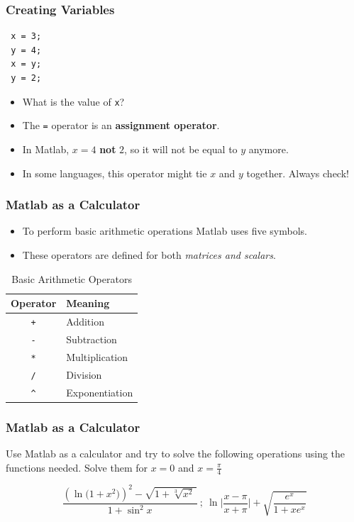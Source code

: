 \documentclass[11pt,xcolor={svgnames},aspectratio=169,usepdftitle=false]{beamer}
\begin{document}
\begin{frame}[fragile]
  \frametitle{Creating Variables}
 \begin{lstlisting}
 x = 3;
 y = 4;
 x = y;
 y = 2;
 \end{lstlisting}
 \begin{itemize}
  \item What is the value of \verb;x;?
  \pause
  \item The \verb;=; operator is an \alert{\textbf{assignment operator}}. 
  \item In Matlab, $x = 4$ \alert{\textbf{not}} $2$, so it will not be equal to $y$ anymore. 
  \item In some languages, this operator might tie $x$ and $y$ together. Always check!
 \end{itemize}
  
\end{frame}

\begin{frame}[fragile]
    \frametitle{Matlab as a Calculator}
    \begin{itemize}
        \item To perform basic arithmetic operations Matlab uses five symbols.
        \item These operators are defined for both \alert{\textit{matrices and scalars}}.
    \end{itemize}
\begin{table}[htbp]
    \caption{Basic Arithmetic Operators}
    \label{tab:basic_operators}
    \begin{tabular}{@{}cl@{}}
    \toprule
    Operator & Meaning \\ \midrule
    \verb;+;  & Addition \\ 
    \verb;-;  & Subtraction \\ 
    \verb;*;  & Multiplication \\ 
    \verb;/;  & Division \\ 
    \verb;^;  & Exponentiation \\ \bottomrule
    \end{tabular}
\end{table}
\end{frame}

\begin{frame}
    \frametitle{Matlab as a Calculator}
\begin{exercise} 
    Use Matlab as a calculator and try to solve the following operations using the functions needed. Solve them for $x = 0$ and $x = \frac{\pi}{4}$
    
    \[
            \frac{\left(\ln\big( 1+x^2\big)\right)^2 - \sqrt{1+\sqrt[3]{x^2}\,}}{1+\sin^2 x} \ ; \  \ln\bigg\lvert\frac{x-\pi}{x+\pi}\bigg\rvert + \sqrt{\frac{e^x}{1+xe^x}}
    \]
\end{exercise}
\end{frame}
\end{document}
